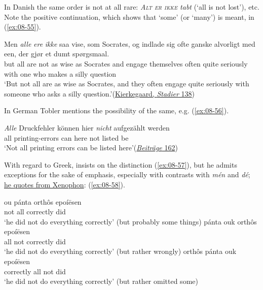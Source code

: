 In Danish the same order is not at all rare: \textit{\textsc{Alt er ikke} tabt} (`all is not lost'), %
etc. Note the positive continuation, which shows that `some' (or `many') is meant, in (\ref{ex:08-55}).

\ea \label{ex:08-55} 
\gll Men \emph{alle} \emph{ere} \emph{ikke} saa vise, som Socrates, og indlade sig ofte ganske alvorligt med een, der gjør et dumt spørgsmaal.\\
 but all are not as wise as Socrates and engage themselves often quite seriously with one who makes a silly question\\
\glt `But not all are as wise as Socrates, and they often engage quite seriously with someone who asks a silly question.'\hfill(\href{https://tekster.kb.dk/text/sks-slv-txt-root#ss146}{Kierkegaard, \textit{Stadier} 138}) %
\z

In German Tobler mentions the possibility of the same, e.g. (\ref{ex:08-56}).

\ea \label{ex:08-56}
\gll \emph{Alle} Druckfehler können hier \emph{nicht} aufgezählt werden\\
 all printing-errors can here not listed be\\
\glt `Not all printing errors can be listed here'\hfill(\href{https://archive.org/details/vermischtebeitr04toblgoog/page/n195/mode/2up?view=theater&q=%22alle+druckfehler%22}{\textit{Beiträge} 162})
\z

With regard to Greek, \citet[\href{https://archive.org/details/griechischesprac00kr/page/296/mode/2up?view=theater}{§67}]{kruger1875griechische} insists on the distinction (\ref{ex:08-57}), but he admits exceptions for the sake of emphasis, especially with contrasts with \textit{mén} and \textit{dé}; \href{https://archive.org/details/griechischesprac00kr/page/304/mode/2up?view=theater&q=%22Havres+pe%26v+obx+7ABov%2C+Ap%C4%B1atos+de+%E2%80%9Car+Apraokos.+%22}{he quotes from Xenophon}: (\ref{ex:08-58}).

\ea \label{ex:08-57}
\ea
\gll ou pánta orthôs epoíēsen\\
 not all correctly did\\
\glt `he did not do everything correctly' \phantom{x}(but probably some things)
\ex
\gll pánta ouk orthôs epoíēsen\\
 all not correctly did\\
\glt `he did not do everything correctly' \phantom{x}(but rather wrongly)
\ex
\gll orthôs pánta ouk epoíēsen\\
 correctly all not did\\
\glt `he did not do everything correctly' \phantom{x}(but rather omitted some)
\z
\z

